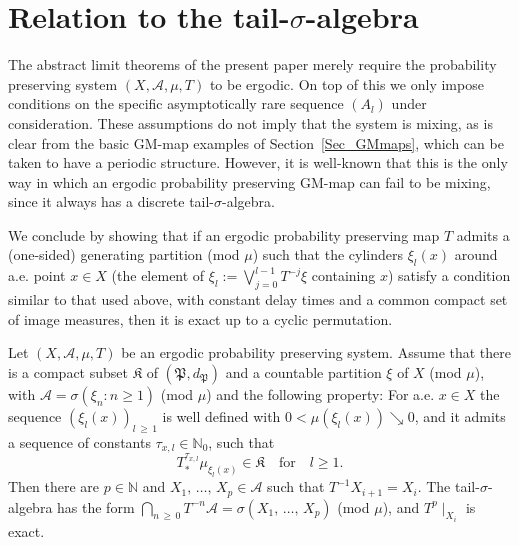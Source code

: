 \documentclass[AHL,Unicode,longabstracts]{cedram}
\newcommand{\clA}{\mathcal{A}}
\newcommand{\frkK}{\mathfrak{K}}
\newcommand{\frkP}{\mathfrak{P}}
\newcommand{\bbN}{\mathbb{N}}
\begin{document}
\section{Relation to the tail-\texorpdfstring{$\sigma$}{sigma}-algebra}

The abstract limit theorems of the present paper merely require the probability preserving system $(X,\clA,\mu,T)$ to be ergodic. On top of this we only impose conditions on the specific asymptotically rare sequence $(A_{l})$ under consideration. These assumptions do not imply that the system is mixing, as is clear from the basic GM-map examples of Section~\ref{Sec_GMmaps}, which can be taken to have a periodic structure. However, it is well-known that this is the only way in which an ergodic probability preserving GM-map can fail to be mixing, since it always has a discrete tail-$\sigma$-algebra.

We conclude by showing that if an ergodic probability preserving map $T$ admits a (one-sided) generating partition (mod $\mu$) such that the cylinders $\xi_{l}(x)$ around a.e. point $x\in X$ (the element of $\xi_{l} :=\bigvee_{j=0}^{l-1}T^{-j}\xi$ containing $x$) satisfy a condition similar to that used above, with constant delay times and a common compact set of image measures, then it is exact up to a cyclic permutation.

\begin{prop}
Let $(X,\clA,\mu,T)$ be an ergodic probability preserving system. Assume that there is a compact subset $\frkK$ of $(\frkP,d_{\frkP})$ and a countable partition $\xi$ of $X$ (mod $\mu$), with $\clA=\sigma(\xi_{n}:n\geq1)$ (mod $\mu$) and the following property: For a.e. $x\in X$ the sequence $(\xi_{l}(x))_{l\,\geq\,1}$ is well defined with $0<\mu(\xi_{l}(x))\searrow0$, and it admits a sequence of constants $\tau_{x,l}\in\bbN_{0}$, such that
\begin{equation}\label{Eq_jshdcsjadhvbh}
T_{\ast}^{\tau_{x,l}}\mu_{\xi_{l}(x)}\in\frkK \quad \text{for} \quad  l\geq1. 
\end{equation}
Then there are $p\in\bbN$ and $X_{1},\,\ldots,\,X_{p}\in\clA$ such that $T^{-1}X_{i+1}=X_{i}$. The tail-$\sigma$-algebra has the form $\bigcap_{n\,\geq\,0}T^{-n}\clA=\sigma(X_{1},\,\ldots,\,X_{p})$ (mod $\mu$), and $T^{p}\mid_{X_{i}}$ is exact.
\end{prop}
\end{document}
